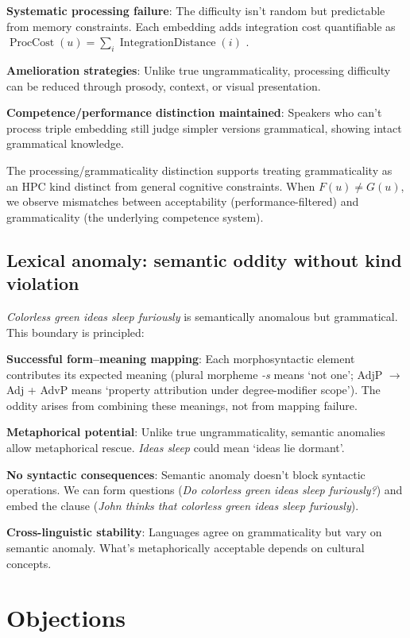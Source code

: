 \documentclass[12pt]{article}
\begin{document}
\textbf{Systematic processing failure}: The difficulty isn't random but predictable from memory constraints. Each embedding adds integration cost quantifiable as $\operatorname{ProcCost}(u) = \sum_{i} \operatorname{IntegrationDistance}(i)$ \parencite{gibson2000}.

\textbf{Amelioration strategies}: Unlike true ungrammaticality, processing difficulty can be reduced through prosody, context, or visual presentation.

\textbf{Competence/performance distinction maintained}: Speakers who can't process triple embedding still judge simpler versions grammatical, showing intact grammatical knowledge.

The processing/grammaticality distinction supports treating grammaticality as an HPC kind distinct from general cognitive constraints. When $F(u) \neq G(u)$, we observe mismatches between acceptability (performance-filtered) and grammaticality (the underlying competence system).

\subsection{Lexical anomaly: semantic oddity without kind violation}

\textit{Colorless green ideas sleep furiously} is semantically anomalous but grammatical. This boundary is principled:

\textbf{Successful form--meaning mapping}: Each morphosyntactic element contributes its expected meaning (plural morpheme \textit{-s} means `not one'; AdjP $\rightarrow$ Adj + AdvP means `property attribution under degree-modifier scope'). The oddity arises from combining these meanings, not from mapping failure.

\textbf{Metaphorical potential}: Unlike true ungrammaticality, semantic anomalies allow metaphorical rescue. \textit{Ideas sleep} could mean `ideas lie dormant'.

\textbf{No syntactic consequences}: Semantic anomaly doesn't block syntactic operations. We can form questions (\textit{Do colorless green ideas sleep furiously?}) and embed the clause (\textit{John thinks that colorless green ideas sleep furiously}).

\textbf{Cross-linguistic stability}: Languages agree on grammaticality but vary on semantic anomaly. What's metaphorically acceptable depends on cultural concepts.

\section{Objections}
\end{document}
